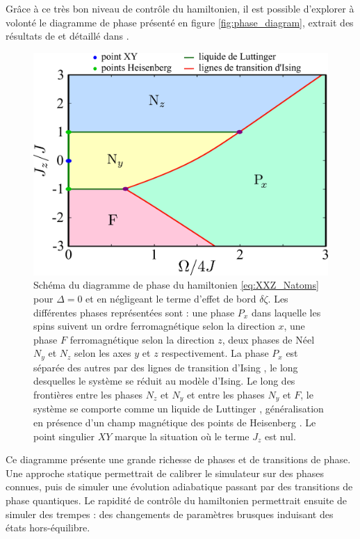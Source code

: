 Grâce à ce très bon niveau de contrôle du hamiltonien, il est possible d'explorer à volonté le diagramme de phase présenté en figure \eqref{fig:phase_diagram}, extrait des résultats de \cite{MX_DMITRIEV02} et détaillé dans \cite{ENS_PRE_CIRCSIM}.
%
\begin{figure}[!h]
\centering
\includegraphics[width=0.7\linewidth]{figures/circsim/phase_diagram}
\caption[Diagramme de phase XXZ]{
Schéma du diagramme de phase du hamiltonien \eqref{eq:XXZ_Natoms} pour $\Delta=0$ et en négligeant le terme d'effet de bord $\delta\zeta$.
Les différentes phases représentées sont : une phase $P_x$ dans laquelle les spins suivent un ordre ferromagnétique selon la direction $x$, une phase $F$ ferromagnétique selon la direction $z$, deux phases de Néel $N_y$ et $N_z$ selon les axes $y$ et $z$ respectivement.
La phase $P_x$ est séparée des autres par des lignes \og de transition d'Ising \fg{}, le long desquelles le système se réduit au modèle d'Ising.
Le long des frontières entre les phases $N_z$ et $N_y$ et entre les phases $N_y$ et $F$, le système se comporte comme un \og liquide de Luttinger \fg{}, généralisation en présence d'un champ magnétique des \og points de Heisenberg \fg{}.
Le point singulier $XY$ marque la situation où le terme $J_z$ est nul.
}
\label{fig:phase_diagram}
\end{figure}
%
Ce diagramme présente une grande richesse de phases et de transitions de phase.
Une approche statique permettrait de calibrer le simulateur sur des phases connues, puis de simuler une évolution adiabatique passant par des transitions de phase quantiques.
Le rapidité de contrôle du hamiltonien permettrait ensuite de simuler des trempes : des changements de paramètres brusques induisant des états hors-équilibre.

